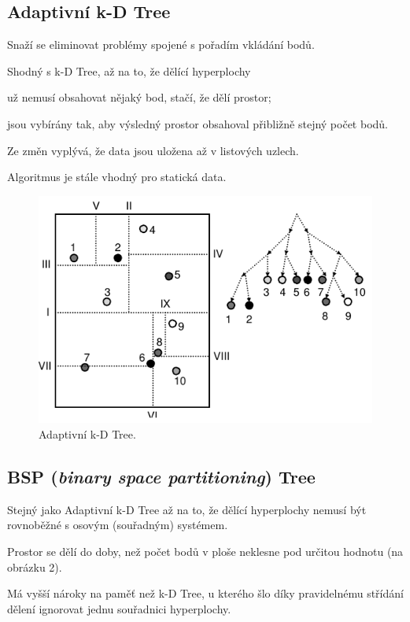 \subsection{Adaptivní k-D Tree}

\begin{compactitem}
    \item Snaží se eliminovat problémy spojené s pořadím vkládání bodů.
    \item Shodný s k-D Tree, až na to, že dělící hyperplochy \begin{compactitem}
        \item už nemusí obsahovat nějaký bod, stačí, že dělí prostor;
        \item jsou vybírány tak, aby výsledný prostor obsahoval přibližně stejný počet bodů.
    \end{compactitem}
    \item Ze změn vyplývá, že data jsou uložena až v listových uzlech.
    \item Algoritmus je stále vhodný pro statická data.
\end{compactitem}

\begin{figure}[H]
    \centering
    \includegraphics[width=0.75\linewidth]{adaptivni_kd_tree.pdf}
    \caption{Adaptivní k-D Tree.}
\end{figure}

\subsection{BSP (\textit{binary space partitioning}) Tree}

\begin{compactitem}
    \item Stejný jako Adaptivní k-D Tree až na to, že dělící hyperplochy nemusí být rovnoběžné s osovým (souřadným) systémem.
    \item Prostor se dělí do doby, než počet bodů v ploše neklesne pod určitou hodnotu (na obrázku 2).
    \item Má vyšší nároky na paměť než k-D Tree, u kterého šlo díky pravidelnému střídání dělení ignorovat jednu souřadnici hyperplochy.
\end{compactitem}

